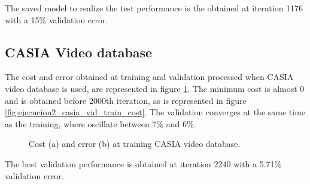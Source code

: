 The saved model to realize the test performance is the obtained at iteration 1176 with a 15\% validation error.

\subsection{CASIA Video database}
The cost and error obtained at training and validation processed when CASIA video database is used, are represented in figure \ref{fig:ejecucion2_casia_vid_train}. The minimum cost is almost 0 and is obtained before 2000th iteration, as is represented in figure \ref{fig:ejecucion2_casia_vid_train_cost}. The validation converges at the same time as the training, where oscillate between 7\% and 6\%.\\
\begin{figure}[htb]
\centering
\caption{Cost (a) and error (b) at training CASIA video database.}
\label{fig:ejecucion2_casia_vid_train}
\end{figure}

The best validation performance is obtained at iteration 2240 with a 5.71\% validation error.

